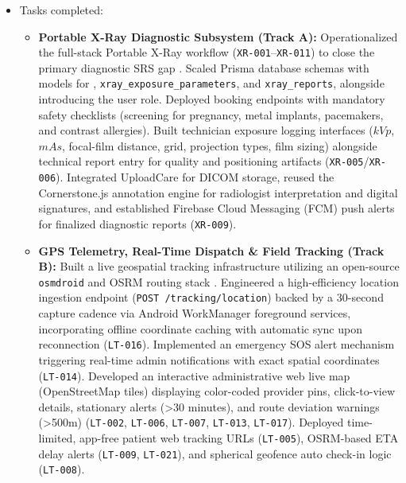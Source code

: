 \documentclass[onecolumn,journal]{IEEEtran}
\begin{document}
	\begin{itemize}
		\item Tasks completed:
		\begin{itemize}
			\item \textbf{Portable X-Ray Diagnostic Subsystem (Track A):} Operationalized the full-stack Portable X-Ray workflow (\texttt{XR-001}--\texttt{XR-011}) to close the primary diagnostic SRS gap \cite{srs2026, dicom2021}. Scaled Prisma database schemas with models for , \texttt{xray\_exposure\_parameters}, and \texttt{xray\_reports}, alongside introducing the  user role. Deployed booking endpoints with mandatory safety checklists (screening for pregnancy, metal implants, pacemakers, and contrast allergies). Built technician exposure logging interfaces ($kVp$, $mAs$, focal-film distance, grid, projection types, film sizing) alongside technical report entry for quality and positioning artifacts (\texttt{XR-005}/\texttt{XR-006}). Integrated UploadCare for DICOM storage, reused the Cornerstone.js annotation engine for radiologist interpretation and digital signatures, and established Firebase Cloud Messaging (FCM) push alerts \cite{firebase2024fcm} for finalized diagnostic reports (\texttt{XR-009}).
			
			\item \textbf{GPS Telemetry, Real-Time Dispatch \& Field Tracking (Track B):} Built a live geospatial tracking infrastructure utilizing an open-source \texttt{osmdroid} and OSRM routing stack \cite{zandbergen2009accuracy, osmdroid2024}. Engineered a high-efficiency location ingestion endpoint (\texttt{POST /tracking/location}) backed by a 30-second capture cadence via Android WorkManager foreground services, incorporating offline coordinate caching with automatic sync upon reconnection (\texttt{LT-016}). Implemented an emergency SOS alert mechanism triggering real-time admin notifications with exact spatial coordinates (\texttt{LT-014}). Developed an interactive administrative web live map (OpenStreetMap tiles) displaying color-coded provider pins, click-to-view details, stationary alerts (>30 minutes), and route deviation warnings (>500m) (\texttt{LT-002}, \texttt{LT-006}, \texttt{LT-007}, \texttt{LT-013}, \texttt{LT-017}). Deployed time-limited, app-free patient web tracking URLs (\texttt{LT-005}), OSRM-based ETA delay alerts (\texttt{LT-009}, \texttt{LT-021}), and spherical geofence auto check-in logic (\texttt{LT-008}).
			

\end{itemize}
\end{itemize}
\end{document}
